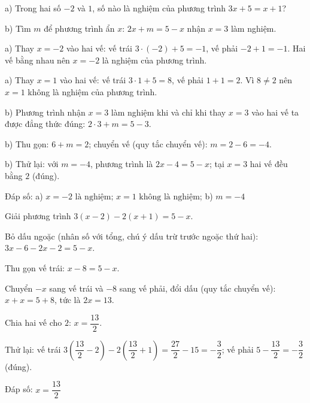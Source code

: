 \begin{problem}[8DS-PT1-002]
a) Trong hai số $-2$ và $1$, số nào là nghiệm của phương trình $3x + 5 = x + 1$?

b) Tìm $m$ để phương trình ẩn $x$: $2x + m = 5 - x$ nhận $x = 3$ làm nghiệm.

\begin{solution}
a) Thay $x = -2$ vào hai vế: vế trái $3 \cdot (-2) + 5 = -1$, vế phải $-2 + 1 = -1$. Hai vế bằng nhau nên $x = -2$ là nghiệm của phương trình.

a) Thay $x = 1$ vào hai vế: vế trái $3 \cdot 1 + 5 = 8$, vế phải $1 + 1 = 2$. Vì $8 \neq 2$ nên $x = 1$ không là nghiệm của phương trình.

b) Phương trình nhận $x = 3$ làm nghiệm khi và chỉ khi thay $x = 3$ vào hai vế ta được đẳng thức đúng: $2 \cdot 3 + m = 5 - 3$.

b) Thu gọn: $6 + m = 2$; chuyển vế (quy tắc chuyển vế): $m = 2 - 6 = -4$.

b) Thử lại: với $m = -4$, phương trình là $2x - 4 = 5 - x$; tại $x = 3$ hai vế đều bằng $2$ (đúng).

Đáp số: a) $\boxed{x = -2 \text{ là nghiệm; } x = 1 \text{ không là nghiệm}}$; b) $\boxed{m = -4}$
\end{solution}
\end{problem}

\begin{problem}[8DS-PT1-003]
Giải phương trình $3(x - 2) - 2(x + 1) = 5 - x$.

\begin{solution}
Bỏ dấu ngoặc (nhân số với tổng, chú ý dấu trừ trước ngoặc thứ hai): $3x - 6 - 2x - 2 = 5 - x$.

Thu gọn vế trái: $x - 8 = 5 - x$.

Chuyển $-x$ sang vế trái và $-8$ sang vế phải, đổi dấu (quy tắc chuyển vế): $x + x = 5 + 8$, tức là $2x = 13$.

Chia hai vế cho $2$: $x = \dfrac{13}{2}$.

Thử lại: vế trái $3\left(\dfrac{13}{2} - 2\right) - 2\left(\dfrac{13}{2} + 1\right) = \dfrac{27}{2} - 15 = -\dfrac{3}{2}$; vế phải $5 - \dfrac{13}{2} = -\dfrac{3}{2}$ (đúng).

Đáp số: $\boxed{x = \dfrac{13}{2}}$
\end{solution}
\end{problem}

